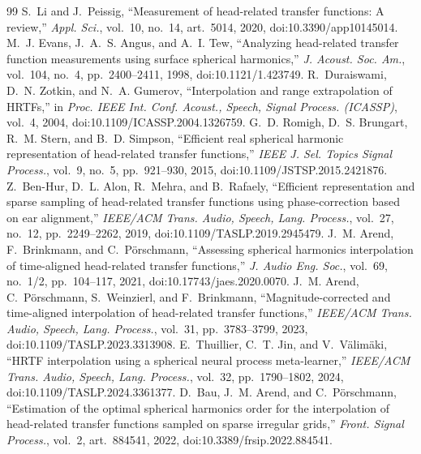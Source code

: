 \documentclass[11pt,a4paper]{article}
\begin{document}

\begingroup
\small
\setlength{\itemsep}{0.5pt}
\begin{thebibliography}{99}
 S.~Li and J.~Peissig, ``Measurement of head-related transfer functions: A review,'' \emph{Appl. Sci.}, vol.~10, no.~14, art.~5014, 2020, doi:10.3390/app10145014.
 M.~J. Evans, J.~A.~S. Angus, and A.~I. Tew, ``Analyzing head-related transfer function measurements using surface spherical harmonics,'' \emph{J. Acoust. Soc. Am.}, vol.~104, no.~4, pp.~2400--2411, 1998, doi:10.1121/1.423749.
 R.~Duraiswami, D.~N. Zotkin, and N.~A. Gumerov, ``Interpolation and range extrapolation of HRTFs,'' in \emph{Proc. IEEE Int. Conf. Acoust., Speech, Signal Process. (ICASSP)}, vol.~4, 2004, doi:10.1109/ICASSP.2004.1326759.
 G.~D. Romigh, D.~S. Brungart, R.~M. Stern, and B.~D. Simpson, ``Efficient real spherical harmonic representation of head-related transfer functions,'' \emph{IEEE J. Sel. Topics Signal Process.}, vol.~9, no.~5, pp.~921--930, 2015, doi:10.1109/JSTSP.2015.2421876.
 Z.~Ben-Hur, D.~L. Alon, R.~Mehra, and B.~Rafaely, ``Efficient representation and sparse sampling of head-related transfer functions using phase-correction based on ear alignment,'' \emph{IEEE/ACM Trans. Audio, Speech, Lang. Process.}, vol.~27, no.~12, pp.~2249--2262, 2019, doi:10.1109/TASLP.2019.2945479.
 J.~M. Arend, F.~Brinkmann, and C.~P\"orschmann, ``Assessing spherical harmonics interpolation of time-aligned head-related transfer functions,'' \emph{J. Audio Eng. Soc.}, vol.~69, no.~1/2, pp.~104--117, 2021, doi:10.17743/jaes.2020.0070.
 J.~M. Arend, C.~P\"orschmann, S.~Weinzierl, and F.~Brinkmann, ``Magnitude-corrected and time-aligned interpolation of head-related transfer functions,'' \emph{IEEE/ACM Trans. Audio, Speech, Lang. Process.}, vol.~31, pp.~3783--3799, 2023, doi:10.1109/TASLP.2023.3313908.
 E.~Thuillier, C.~T. Jin, and V.~V\"alim\"aki, ``HRTF interpolation using a spherical neural process meta-learner,'' \emph{IEEE/ACM Trans. Audio, Speech, Lang. Process.}, vol.~32, pp.~1790--1802, 2024, doi:10.1109/TASLP.2024.3361377.
 D.~Bau, J.~M. Arend, and C.~P\"orschmann, ``Estimation of the optimal spherical harmonics order for the interpolation of head-related transfer functions sampled on sparse irregular grids,'' \emph{Front. Signal Process.}, vol.~2, art.~884541, 2022, doi:10.3389/frsip.2022.884541.

\end{thebibliography}
\end{document}
